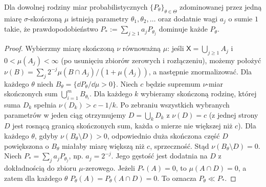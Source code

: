 \begin{lemat}\label{lem:halmos-savage}
Dla dowolnej rodziny miar probabilistycznych $\{P_\theta\}_{\theta\in\Theta}$
zdominowanej przez jedną miarę $\sigma$-skończoną $\mu$
istnieją parametry $\theta_1,\theta_2,\ldots$ oraz dodatnie wagi
$a_j$ o sumie $1$ takie, że prawdopodobieństwo
$P_*:=\sum_{j\ge1}a_jP_{\theta_j}$ dominuje każde $P_\theta$.
\end{lemat}
\begin{proof}
Wybierzmy miarę skończoną $\nu$ równoważną $\mu$: jeśli
$\mathsf X=\bigcup_{j\ge1}A_j$ i $0<\mu(A_j)<\infty$
(po usunięciu zbiorów zerowych i rozłączeniu), możemy położyć
$\nu(B)=\sum_j2^{-j}\mu(B\cap A_j)/(1+\mu(A_j))$,
a następnie znormalizować. Dla każdego $\theta$ niech
$B_\theta=\{\dd P_\theta/\dd\mu>0\}$.
Niech $c$ będzie supremum $\nu$-miar skończonych sum
$\bigcup_{i=1}^m B_{\theta_i}$. Dla każdego $k$ wybieramy
skończoną rodzinę, której suma $D_k$ spełnia
$\nu(D_k)>c-1/k$. Po zebraniu wszystkich wybranych parametrów
w jeden ciąg otrzymujemy $D=\bigcup_kD_k$ z $\nu(D)=c$
(z jednej strony $D$ jest rosnącą granicą skończonych sum,
każda o mierze nie większej niż $c$). Dla każdego $\theta$,
gdyby $\nu(B_\theta\setminus D)>0$, odpowiednio duża skończona
część $D$ powiększona o $B_\theta$ miałaby miarę większą niż $c$,
sprzeczność. Stąd $\nu(B_\theta\setminus D)=0$.
Niech $P_*=\sum_j a_jP_{\theta_j}$, np. $a_j=2^{-j}$.
Jego gęstość jest dodatnia na $D$ z dokładnością do zbioru
$\mu$-zerowego. Jeżeli $P_*(A)=0$, to
$\mu(A\cap D)=0$, a zatem dla każdego $\theta$
$P_\theta(A)=P_\theta(A\cap D)=0$. To oznacza $P_\theta\ll P_*$.
\end{proof}

